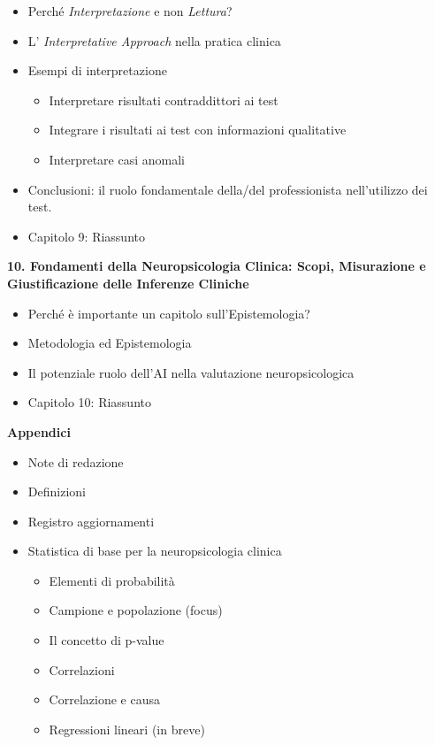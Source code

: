\documentclass[
  italian,
  letterpaper,
  paper=A4,
  headinclude=on,
  footinclude=on,
  12pt]{scrbook}
\providecommand{\tightlist}{%
  \setlength{\itemsep}{0pt}\setlength{\parskip}{0pt}}
\begin{document}
\begin{itemize}
\tightlist
\item
  Perché \emph{Interpretazione} e non \emph{Lettura}?
\item
  L' \emph{Interpretative Approach} nella pratica clinica
\item
  Esempi di interpretazione

  \begin{itemize}
  \tightlist
  \item
    Interpretare risultati contraddittori ai test
  \item
    Integrare i risultati ai test con informazioni qualitative
  \item
    Interpretare casi anomali
  \end{itemize}
\item
  Conclusioni: il ruolo fondamentale della/del professionista
  nell'utilizzo dei test.
\item
  Capitolo 9: Riassunto
\end{itemize}

\textbf{10. Fondamenti della Neuropsicologia Clinica: Scopi, Misurazione
e Giustificazione delle Inferenze Cliniche}

\begin{itemize}
\tightlist
\item
  Perché è importante un capitolo sull'Epistemologia?
\item
  Metodologia ed Epistemologia
\item
  Il potenziale ruolo dell'AI nella valutazione neuropsicologica
\item
  Capitolo 10: Riassunto
\end{itemize}

\textbf{Appendici}

\begin{itemize}
\tightlist
\item
  Note di redazione
\item
  Definizioni
\item
  Registro aggiornamenti
\item
  Statistica di base per la neuropsicologia clinica

  \begin{itemize}
  \tightlist
  \item
    Elementi di probabilità
  \item
    Campione e popolazione (focus)
  \item
    Il concetto di p-value
  \item
    Correlazioni
  \item
    Correlazione e causa
  \item
    Regressioni lineari (in breve)
  \end{itemize}
\end{itemize}
\end{document}
